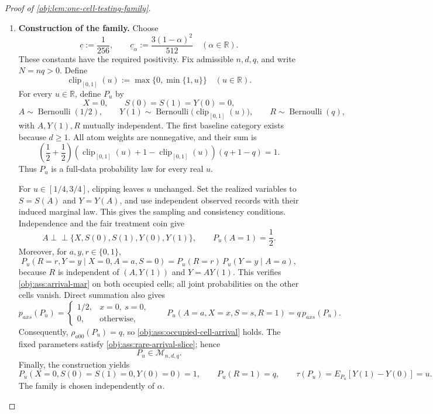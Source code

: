 \begin{proof}[Proof of \cref{obj:lem:one-cell-testing-family}]
\begin{enumerate}
\item \textbf{Construction of the family.}
Choose
\[
\underline c:=\frac1{256},
\qquad
\underline c_\alpha:=\frac{3(1-\alpha)^2}{512}
\quad(\alpha\in\mathbb R).
\]
These constants have the required positivity. Fix admissible \(n,d,q\), and write \(N=nq>0\). Define
\[
\operatorname{clip}_{[0,1]}(u):=\max\{0,\min\{1,u\}\}
\quad(u\in\mathbb R).
\]
For every \(u\in\mathbb R\), define \(P_u\) by
\[
X=0,\qquad S(0)=S(1)=Y(0)=0,
\]
\[
A\sim\operatorname{Bernoulli}(1/2),\qquad
Y(1)\sim\operatorname{Bernoulli}
       \bigl(\operatorname{clip}_{[0,1]}(u)\bigr),\qquad
R\sim\operatorname{Bernoulli}(q),
\]
with \(A,Y(1),R\) mutually independent. The first baseline category exists because \(d\ge1\). All atom weights are nonnegative, and their sum is
\[
\left(\frac12+\frac12\right)
\left(\operatorname{clip}_{[0,1]}(u)
      +1-\operatorname{clip}_{[0,1]}(u)\right)
\left(q+1-q\right)=1.
\]
Thus \(P_u\) is a full-data probability law for every real \(u\).

For \(u\in[1/4,3/4]\), clipping leaves \(u\) unchanged. Set the realized variables to \(S=S(A)\) and \(Y=Y(A)\), and use independent observed records with their induced marginal law. This gives the sampling and consistency conditions. Independence and the fair treatment coin give
\[
A\perp\!\!\!\perp
  \{X,S(0),S(1),Y(0),Y(1)\},
\qquad P_u(A=1)=\frac12.
\]
Moreover, for \(a,y,r\in\{0,1\}\),
\[
P_u(R=r,Y=y\mid X=0,A=a,S=0)
=
P_u(R=r)\,P_u(Y=y\mid A=a),
\]
because \(R\) is independent of \((A,Y(1))\) and \(Y=AY(1)\). This verifies \cref{obj:ass:arrival-mar} on both occupied cells; all joint probabilities on the other cells vanish. Direct summation also gives
\[
p_{axs}(P_u)=
\begin{cases}
1/2,&x=0,\ s=0,\\
0,&\text{otherwise},
\end{cases}
\qquad
P_u(A=a,X=x,S=s,R=1)=q\,p_{axs}(P_u).
\]
Consequently, \(\rho_{a00}(P_u)=q\), so
\cref{obj:ass:occupied-cell-arrival} holds. The fixed parameters satisfy
\cref{obj:ass:rare-arrival-slice}; hence
\[
P_u\in\mathcal M_{n,d,q}.
\]
Finally, the construction yields
\[
P_u\!\left(X=0,S(0)=S(1)=0,Y(0)=0\right)=1,
\qquad P_u(R=1)=q,
\qquad
\tau(P_u)=E_{P_u}[Y(1)-Y(0)]=u.
\]
The family is chosen independently of \(\alpha\).


\end{enumerate}
\end{proof}
